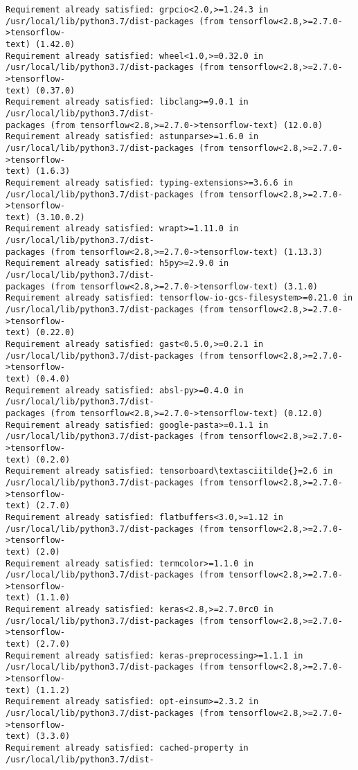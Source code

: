 \documentclass[11pt]{article}
\begin{document}
\begin{Verbatim}[commandchars=\\\{\}]
Requirement already satisfied: grpcio<2.0,>=1.24.3 in
/usr/local/lib/python3.7/dist-packages (from tensorflow<2.8,>=2.7.0->tensorflow-
text) (1.42.0)
Requirement already satisfied: wheel<1.0,>=0.32.0 in
/usr/local/lib/python3.7/dist-packages (from tensorflow<2.8,>=2.7.0->tensorflow-
text) (0.37.0)
Requirement already satisfied: libclang>=9.0.1 in /usr/local/lib/python3.7/dist-
packages (from tensorflow<2.8,>=2.7.0->tensorflow-text) (12.0.0)
Requirement already satisfied: astunparse>=1.6.0 in
/usr/local/lib/python3.7/dist-packages (from tensorflow<2.8,>=2.7.0->tensorflow-
text) (1.6.3)
Requirement already satisfied: typing-extensions>=3.6.6 in
/usr/local/lib/python3.7/dist-packages (from tensorflow<2.8,>=2.7.0->tensorflow-
text) (3.10.0.2)
Requirement already satisfied: wrapt>=1.11.0 in /usr/local/lib/python3.7/dist-
packages (from tensorflow<2.8,>=2.7.0->tensorflow-text) (1.13.3)
Requirement already satisfied: h5py>=2.9.0 in /usr/local/lib/python3.7/dist-
packages (from tensorflow<2.8,>=2.7.0->tensorflow-text) (3.1.0)
Requirement already satisfied: tensorflow-io-gcs-filesystem>=0.21.0 in
/usr/local/lib/python3.7/dist-packages (from tensorflow<2.8,>=2.7.0->tensorflow-
text) (0.22.0)
Requirement already satisfied: gast<0.5.0,>=0.2.1 in
/usr/local/lib/python3.7/dist-packages (from tensorflow<2.8,>=2.7.0->tensorflow-
text) (0.4.0)
Requirement already satisfied: absl-py>=0.4.0 in /usr/local/lib/python3.7/dist-
packages (from tensorflow<2.8,>=2.7.0->tensorflow-text) (0.12.0)
Requirement already satisfied: google-pasta>=0.1.1 in
/usr/local/lib/python3.7/dist-packages (from tensorflow<2.8,>=2.7.0->tensorflow-
text) (0.2.0)
Requirement already satisfied: tensorboard\textasciitilde{}=2.6 in
/usr/local/lib/python3.7/dist-packages (from tensorflow<2.8,>=2.7.0->tensorflow-
text) (2.7.0)
Requirement already satisfied: flatbuffers<3.0,>=1.12 in
/usr/local/lib/python3.7/dist-packages (from tensorflow<2.8,>=2.7.0->tensorflow-
text) (2.0)
Requirement already satisfied: termcolor>=1.1.0 in
/usr/local/lib/python3.7/dist-packages (from tensorflow<2.8,>=2.7.0->tensorflow-
text) (1.1.0)
Requirement already satisfied: keras<2.8,>=2.7.0rc0 in
/usr/local/lib/python3.7/dist-packages (from tensorflow<2.8,>=2.7.0->tensorflow-
text) (2.7.0)
Requirement already satisfied: keras-preprocessing>=1.1.1 in
/usr/local/lib/python3.7/dist-packages (from tensorflow<2.8,>=2.7.0->tensorflow-
text) (1.1.2)
Requirement already satisfied: opt-einsum>=2.3.2 in
/usr/local/lib/python3.7/dist-packages (from tensorflow<2.8,>=2.7.0->tensorflow-
text) (3.3.0)
Requirement already satisfied: cached-property in /usr/local/lib/python3.7/dist-

\end{Verbatim}
\end{document}
